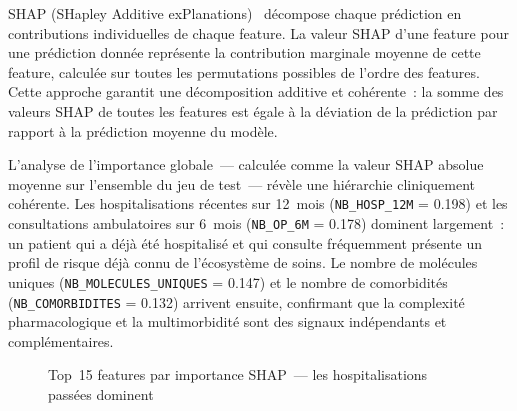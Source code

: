 SHAP (SHapley Additive exPlanations)~\cite{lundberg2017unified} décompose
chaque prédiction en contributions individuelles de chaque feature. La valeur
SHAP d'une feature pour une prédiction donnée représente la contribution marginale
moyenne de cette feature, calculée sur toutes les permutations possibles de l'ordre
des features. Cette approche garantit une décomposition additive et cohérente~:
la somme des valeurs SHAP de toutes les features est égale à la déviation de la
prédiction par rapport à la prédiction moyenne du modèle.

L'analyse de l'importance globale~--- calculée comme la valeur SHAP absolue moyenne
sur l'ensemble du jeu de test~--- révèle une hiérarchie cliniquement cohérente. Les
hospitalisations récentes sur 12~mois (\texttt{NB\_HOSP\_12M} = 0.198) et les
consultations ambulatoires sur 6~mois (\texttt{NB\_OP\_6M} = 0.178) dominent
largement~: un patient qui a déjà été hospitalisé et qui consulte fréquemment présente
un profil de risque déjà connu de l'écosystème de soins. Le nombre de molécules
uniques (\texttt{NB\_MOLECULES\_UNIQUES} = 0.147) et le nombre de comorbidités
(\texttt{NB\_COMORBIDITES} = 0.132) arrivent ensuite, confirmant que la complexité
pharmacologique et la multimorbidité sont des signaux indépendants et complémentaires.

\begin{figure}[htbp]
\centering
{}
\caption{Top~15 features par importance SHAP~--- les hospitalisations passées dominent}
\label{fig:shap}
\end{figure}

